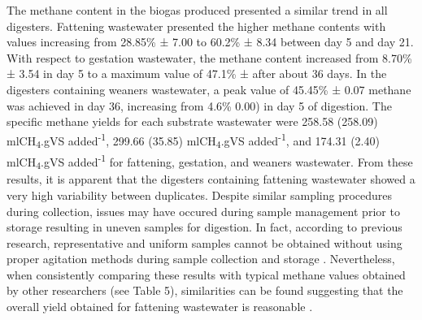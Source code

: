 The methane content in the biogas produced presented a similar trend in all digesters. Fattening wastewater presented the higher methane contents with values increasing from 28.85\% ± 7.00 to 60.2\% ± 8.34 between day 5 and day 21. With respect to gestation wastewater, the methane content increased from 8.70\% ± 3.54 in day 5 to a maximum value of 47.1\% ± after about 36 days. In the digesters containing weaners wastewater, a peak value of 45.45\% ± 0.07 methane was achieved in day 36, increasing from 4.6\% 0.00) in day 5 of digestion. The specific methane yields for each substrate wastewater were 258.58 (258.09) mlCH\textsubscript{4}.gVS added\textsuperscript{-1}, 299.66 (35.85) mlCH\textsubscript{4}.gVS added\textsuperscript{-1}, and 174.31 (2.40) mlCH\textsubscript{4}.gVS added\textsuperscript{-1} for fattening, gestation, and weaners wastewater. From these results, it is apparent that the digesters containing fattening wastewater showed a very high variability between duplicates. Despite similar sampling procedures during collection, issues may have occured during sample management prior to storage resulting in uneven samples for digestion. In fact,  according to previous research, representative and uniform samples cannot be obtained without using proper agitation methods during sample collection and storage \cite{Zhu_2004}. Nevertheless, when consistently comparing these results with typical methane values obtained by other researchers (see Table 5), similarities can be found suggesting that the overall yield obtained for fattening wastewater is  reasonable \cite{Guo_2012,Zhang_2014}.